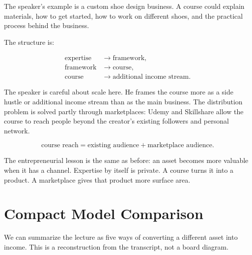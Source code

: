 The speaker's example is a custom shoe design business. A course could explain materials, how to get started, how to work on different shoes, and the practical process behind the business.

The structure is:

\begin{align}
\text{expertise}
&\longrightarrow
\text{framework},\\
\text{framework}
&\longrightarrow
\text{course},\\
\text{course}
&\longrightarrow
\text{additional income stream}.
\end{align}

The speaker is careful about scale here. He frames the course more as a side hustle or additional income stream than as the main business. The distribution problem is solved partly through marketplaces: Udemy and Skillshare allow the course to reach people beyond the creator's existing followers and personal network.

\begin{equation}
\text{course reach}
=
\text{existing audience}
+
\text{marketplace audience}.
\end{equation}

The entrepreneurial lesson is the same as before: an asset becomes more valuable when it has a channel. Expertise by itself is private. A course turns it into a product. A marketplace gives that product more surface area.

\section{Compact Model Comparison}

We can summarize the lecture as five ways of converting a different asset into income. This is a reconstruction from the transcript, not a board diagram.

